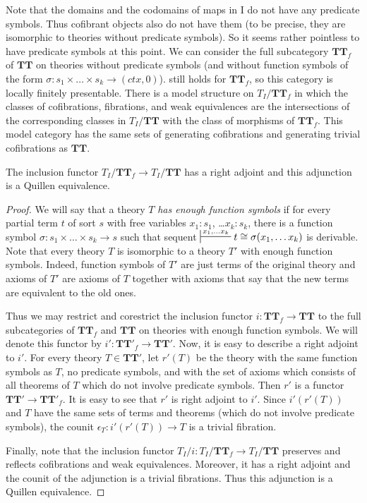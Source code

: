 \documentclass[reqno]{amsart}
\theoremstyle{definition}
\theoremstyle{remark}
\newcommand{\cat}[1]{\mathbf{#1}}
\newcommand{\algtt}{\cat{TT}}
\newcommand{\I}{\mathrm{I}}
\numberwithin{figure}{section}
\begin{document}
Note that the domains and the codomains of maps in $\I$ do not have any predicate symbols.
Thus cofibrant objects also do not have them (to be precise, they are isomorphic to theories without predicate symbols).
So it seems rather pointless to have predicate symbols at this point.
We can consider the full subcategory $\algtt_f$ of $\algtt$ on theories without predicate symbols
(and without function symbols of the form $\sigma : s_1 \times \ldots \times s_k \to (ctx,0)$).
 still holds for $\algtt_f$, so this category is locally finitely presentable.
There is a model structure on $T_I/\algtt_f$ in which the classes of cofibrations, fibrations, and weak equivalences
are the intersections of the corresponding classes in $T_I/\algtt$ with the class of morphisms of $\algtt_f$.
This model category has the same sets of generating cofibrations and generating trivial cofibrations as $\algtt$.

\begin{prop}
The inclusion functor $T_I/\algtt_f \to T_I/\algtt$ has a right adjoint and this adjunction is a Quillen equivalence.
\end{prop}
\begin{proof}
We will say that a theory $T$ \emph{has enough function symbols} if for every partial term $t$ of sort $s$ with free variables $x_1 : s_1$, \ldots $x_k : s_k$,
there is a function symbol $\sigma : s_1 \times \ldots \times s_k \to s$ such that sequent $\sststile{}{x_1, \ldots x_k} t \cong \sigma(x_1, \ldots x_k)$ is derivable.
Note that every theory $T$ is isomorphic to a theory $T'$ with enough function symbols.
Indeed, function symbols of $T'$ are just terms of the original theory and
axioms of $T'$ are axioms of $T$ together with axioms that say that the new terms are equivalent to the old ones.

Thus we may restrict and corestrict the inclusion functor $i : \algtt_f \to \algtt$ to the full subcategories of $\algtt_f$ and $\algtt$ on theories with enough function symbols.
We will denote this functor by $i' : \algtt'_f \to \algtt'$.
Now, it is easy to describe a right adjoint to $i'$.
For every theory $T \in \algtt'$, let $r'(T)$ be the theory with the same function symbols as $T$, no predicate symbols,
and with the set of axioms which consists of all theorems of $T$ which do not involve predicate symbols.
Then $r'$ is a functor $\algtt' \to \algtt'_f$.
It is easy to see that $r'$ is right adjoint to $i'$.
Since $i'(r'(T))$ and $T$ have the same sets of terms and theorems (which do not involve predicate symbols), the counit $\epsilon_T : i'(r'(T)) \to T$ is a trivial fibration.

Finally, note that the inclusion functor $T_I/i : T_I/\algtt_f \to T_I/\algtt$ preserves and reflects cofibrations and weak equivalences.
Moreover, it has a right adjoint and the counit of the adjunction is a trivial fibrations.
Thus this adjunction is a Quillen equivalence.
\end{proof}
\end{document}
